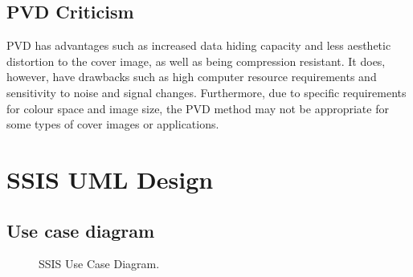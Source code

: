 \section{ PVD Criticism }
PVD has advantages such as increased data hiding capacity and less aesthetic distortion to the cover image, as well as being compression resistant. It does, however, have drawbacks such as high computer resource requirements and sensitivity to noise and signal changes. Furthermore, due to specific requirements for colour space and image size, the PVD method may not be appropriate for some types of cover images or applications.

\chapter{SSIS UML Design}
\section{Use case diagram}
\begin{figure}[ht!]
\centering
{}
\caption{SSIS Use Case Diagram.}
\end{figure}
